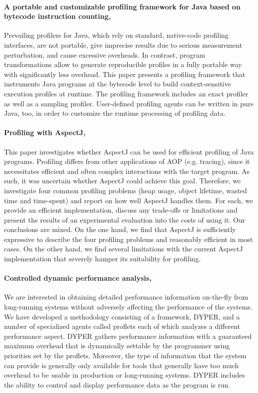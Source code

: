 \paragraph{A portable and customizable profiling framework for Java based on bytecode instruction counting, \cite{Binder2005}}
Prevailing profilers for Java, which rely on standard, native-code profiling interfaces, are not portable, give imprecise results due to serious measurement perturbation, and cause excessive overheads.
In contrast, program transformations allow to generate reproducible profiles in a fully portable way with significantly less overhead.
This paper presents a profiling framework that instruments Java programs at the bytecode level to build context-sensitive execution profiles at runtime.
The profiling framework includes an exact profiler as well as a sampling profiler.
User-defined profiling agents can be written in pure Java, too, in order to customize the runtime processing of profiling data.
\paragraph{Profiling with AspectJ, \cite{Pearce:2007:PA:1248445.1248448}}
This paper investigates whether AspectJ can be used for efficient profiling of Java programs.
Profiling differs from other applications of AOP (e.g. tracing), since it necessitates efficient and often complex
interactions with the target program.
As such, it was uncertain whether AspectJ could achieve this goal.
Therefore, we investigate four common profiling problems (heap usage, object lifetime, wasted time and
time-spent) and report on how well AspectJ handles them.
For each, we provide an efficient implementation,
discuss any trade-offs or limitations and present the results of an experimental evaluation into the costs
of using it.
Our conclusions are mixed. On the one hand, we find that AspectJ is sufficiently expressive
to describe the four profiling problems and reasonably efficient in most cases.
On the other hand, we find several limitations with the current AspectJ implementation that severely hamper its suitability for
profiling.

\paragraph{Controlled dynamic performance analysis, \cite{Reiss:2008:CDP:1383559.1383566}}
We are interested in obtaining detailed performance information
on-the-fly from long-running systems without adversely affecting
the performance of the systems.
We have developed a methodology consisting of a framework, DYPER, and a number of
specialized agents called proflets each of which analyzes a
different performance aspect.
DYPER gathers performance information with a guaranteed maximum overhead that is
dynamically settable by the programmer using priorities set by the
proflets.
Moreover, the type of information that the system can
provide is generally only available for tools that generally have too
much overhead to be usable in production or long-running
systems.
DYPER includes the ability to control and display
performance data as the program is run.


